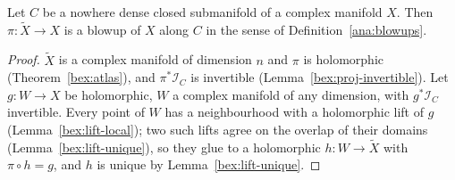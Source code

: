 \begin{theorem}
\label{bex:blowup-exists}
\leanok
Let \(C\) be a nowhere dense closed submanifold of a complex manifold \(X\). Then \(\pi\colon\tilde X\to X\) is a blowup of \(X\) along \(C\) in
the sense of Definition~\ref{ana:blowups}.
\end{theorem}
\begin{proof}
\leanok
\(\tilde X\) is a complex manifold of dimension \(n\) and \(\pi\) is holomorphic (Theorem~\ref{bex:atlas}), and \(\pi^*\mathcal I_C\) is invertible
(Lemma~\ref{bex:proj-invertible}). Let \(g\colon W\to X\) be holomorphic, \(W\) a complex manifold of any dimension, with \(g^*\mathcal I_C\)
invertible. Every point of \(W\) has a neighbourhood with a holomorphic lift of \(g\) (Lemma~\ref{bex:lift-local}); two such lifts agree on the
overlap of their domains (Lemma~\ref{bex:lift-unique}), so they glue to a holomorphic \(h\colon W\to\tilde X\) with \(\pi\circ h=g\), and \(h\) is
unique by Lemma~\ref{bex:lift-unique}.
\end{proof}